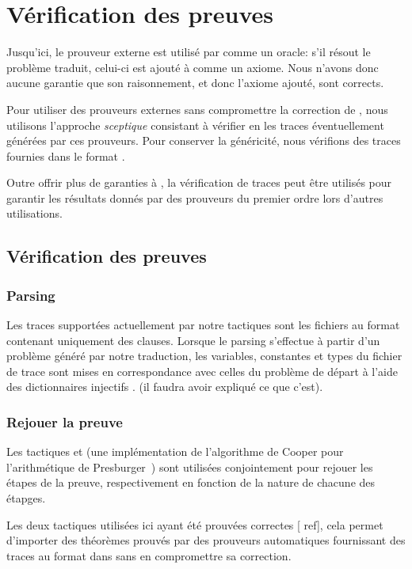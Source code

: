 \section{Vérification des preuves \tff}
\label{sec:traces}

Jusqu'ici, le prouveur externe est utilisé par \holfour comme un
oracle: s'il résout le problème traduit, celui-ci est ajouté à \holfour
comme un axiome. Nous n'avons donc aucune garantie que son raisonnement,
et donc l'axiome ajouté, sont corrects.

Pour utiliser des prouveurs externes sans compromettre la correction de
\holfour, nous utilisons l'approche \emph{sceptique} consistant à
vérifier en \holfour les traces éventuellement générées par ces
prouveurs. Pour conserver la généricité, nous vérifions des traces
fournies dans le format \tff.

Outre offrir plus de garanties à \holfour, la vérification de traces
\tff peut être utilisés pour garantir les résultats donnés par des
prouveurs du premier ordre lors d'autres utilisations.


\subsection{Vérification des preuves}
\subsubsection{Parsing}
Les traces supportées actuellement par notre tactiques sont les fichiers
au format \tff contenant uniquement des clauses. Lorsque le parsing
s'effectue à partir d'un problème généré par notre traduction, les
variables, constantes et types du fichier de trace sont mises en
correspondance avec celles du problème de départ à l'aide des
dictionnaires injectifs \holfour. (\todo il faudra avoir expliqué ce que c'est).


\subsubsection{Rejouer la preuve}

Les tactiques \metistac et \coopertac (une implémentation de
l'algorithme de Cooper pour l'arithmétique de
Presburger~\cite{Norrish03completeinteger}) sont utilisées conjointement
pour rejouer les étapes de la preuve, respectivement en fonction de la
nature de chacune des étapges.

Les deux tactiques utilisées ici ayant été prouvées correctes [\todo
ref], cela permet d'importer des théorèmes prouvés par des prouveurs
automatiques fournissant des traces au format \tff dans \holfour sans en
compromettre sa correction.

